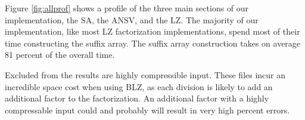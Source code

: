 Figure \ref{fig:allprof} shows a profile of the three main sections of our implementation, the SA, the ANSV, and the LZ.
The majority of our implementation, like most LZ factorization implementations, spend most of their time constructing the suffix array.
The suffix array construction takes on average 81 percent of the overall time.

Excluded from the results are highly compressible input.
These files incur an incredible space cost when using BLZ, as each division is likely to add an additional factor to the factorization.
An additional factor with a highly compressable input could and probably will result in very high percent errors.
